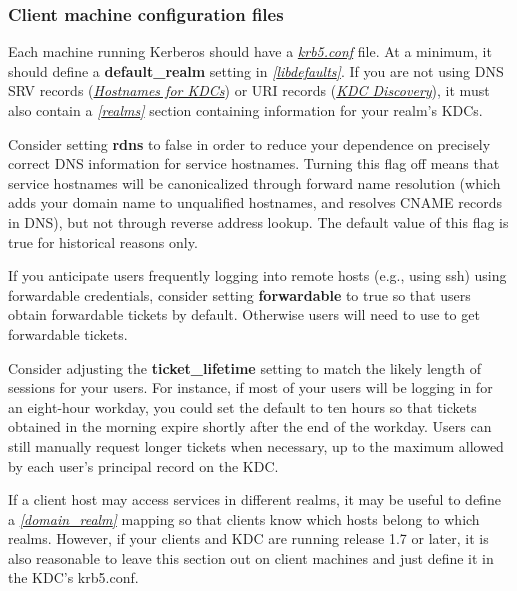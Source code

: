 \documentclass[letterpaper,10pt,english]{sphinxmanual}
\begin{document}
\subsubsection{Client machine configuration files}
\label{admin/install_clients:client-machine-configuration-files}
Each machine running Kerberos should have a {\hyperref[admin/conf_files/krb5_conf:krb5-conf-5]{\emph{krb5.conf}}} file.
At a minimum, it should define a \textbf{default\_realm} setting in
{\hyperref[admin/conf_files/krb5_conf:libdefaults]{\emph{{[}libdefaults{]}}}}.  If you are not using DNS SRV records
({\hyperref[admin/realm_config:kdc-hostnames]{\emph{Hostnames for KDCs}}}) or URI records ({\hyperref[admin/realm_config:kdc-discovery]{\emph{KDC Discovery}}}), it must
also contain a {\hyperref[admin/conf_files/krb5_conf:realms]{\emph{{[}realms{]}}}} section containing information for your
realm's KDCs.

Consider setting \textbf{rdns} to false in order to reduce your dependence
on precisely correct DNS information for service hostnames.  Turning
this flag off means that service hostnames will be canonicalized
through forward name resolution (which adds your domain name to
unqualified hostnames, and resolves CNAME records in DNS), but not
through reverse address lookup.  The default value of this flag is
true for historical reasons only.

If you anticipate users frequently logging into remote hosts
(e.g., using ssh) using forwardable credentials, consider setting
\textbf{forwardable} to true so that users obtain forwardable tickets by
default.  Otherwise users will need to use  to get
forwardable tickets.

Consider adjusting the \textbf{ticket\_lifetime} setting to match the likely
length of sessions for your users.  For instance, if most of your
users will be logging in for an eight-hour workday, you could set the
default to ten hours so that tickets obtained in the morning expire
shortly after the end of the workday.  Users can still manually
request longer tickets when necessary, up to the maximum allowed by
each user's principal record on the KDC.

If a client host may access services in different realms, it may be
useful to define a {\hyperref[admin/conf_files/krb5_conf:domain-realm]{\emph{{[}domain\_realm{]}}}} mapping so that clients know
which hosts belong to which realms.  However, if your clients and KDC
are running release 1.7 or later, it is also reasonable to leave this
section out on client machines and just define it in the KDC's
krb5.conf.
\end{document}
